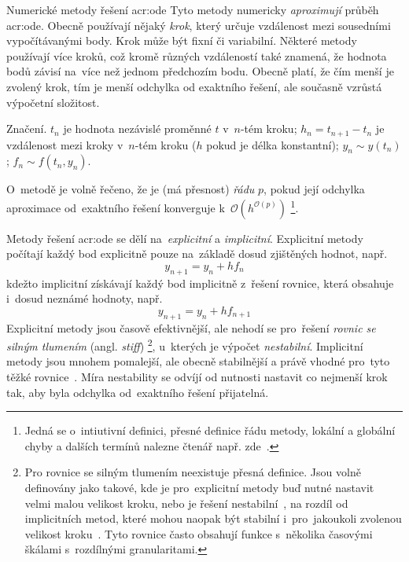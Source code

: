 \documentclass[thesis=M,czech]{FITthesis}[2012/06/26]
\newcommand{\acrlabel}[1]{acr:#1}
\newcommand{\acr}[1]{\acrshort{\acrlabel{#1}}}
\newcommand{\hl}[1]{\textit{#1}}
\newcommand{\name}[1]{\hl{#1}}
\newcommand{\cit}[1]{\cite{#1}}
\newcommand{\set}[1]{\ensuremath{\mathcal{#1}}}
\begin{document}
\begin{section}{Numerické metody řešení \acr{ode}}\label{s:search:ode}
Tyto metody numericky \hl{aproximují} průběh \acr{ode}.
Obecně používají nějaký \name{krok},
který určuje vzdálenost mezi sousedními vypočítávanými body.
Krok může být fixní či variabilní.
Některé metody používají více kroků,
což kromě různých vzdáleností také znamená,
že hodnota bodů závisí na~více než jednom předchozím bodu.
Obecně platí, že čím menší je zvolený krok,
tím je menší odchylka od exaktního řešení,
ale současně vzrůstá výpočetní složitost.


\begin{paragraph}{Značení.}\label{p:search:ode:sign}
$t_n$ je hodnota nezávislé proměnné $t$ v~$n$-tém kroku;
$h_n = {t_{n+1} - t_{n}}$ je vzdálenost mezi kroky v~$n$-tém kroku
($h$ pokud je délka konstantní);
${y_n \sim y(t_n)}$;
${f_n \sim f(t_n, y_n)}$.

O~metodě je volně řečeno, že je (má přesnost) \name{řádu} $p$,
pokud její odchylka aproximace od~exaktního řešení
konverguje k~${\set{O}( h^{\set{O}(p)} )}$\:%
\footnote{Jedná se o~intiutivní definici,
přesné definice řádu metody,
lokální a globální chyby a dalších termínů
nalezne čtenář např. zde~\cit{ode-nsolve-intro}.}.
\end{paragraph} %


\bigskip

Metody řešení \acr{ode} se dělí
na~\name{explicitní} a \name{implicitní}.
Explicitní metody počítají každý bod explicitně
pouze na~základě dosud zjištěných hodnot, např.
\begin{equation}\label{eq:ode:explicit}
   y_{n+1} = y_n + h f_n
\end{equation}
kdežto implicitní získávají každý bod implicitně z~řešení rovnice,
která obsahuje i~dosud neznámé hodnoty, např.
\begin{equation}\label{eq:ode:implicit}
   y_{n+1} = y_{n} + h f_{n+1}
\end{equation}
Explicitní metody jsou časově efektivnější,
ale nehodí se pro~řešení
\name{rovnic se silným tlumením} (angl. \name{stiff})%
\footnote{Pro rovnice se silným tlumením
neexistuje přesná definice.
Jsou volně definovány
jako takové, kde je pro~explicitní metody buď nutné nastavit
velmi malou velikost kroku,
nebo je řešení nestabilní~\cit{ode-nsolve},
na rozdíl od implicitních metod,
které mohou naopak být stabilní
i~pro~jakoukoli zvolenou velikost kroku~\cit{ode-nsolve-intro}.
Tyto rovnice často obsahují funkce s~několika
časovými škálami s~rozdílnými granularitami.},
u~kterých je výpočet \hl{nestabilní}.
Implicitní metody jsou mnohem pomalejší, ale obecně stabilnější
a právě vhodné pro~tyto těžké rovnice~\cit{ode-nsolve-intro}.
Míra nestability se odvíjí od nutnosti nastavit co nejmenší krok tak,
aby byla odchylka od~exaktního řešení přijatelná.


\end{section}
\end{document}
